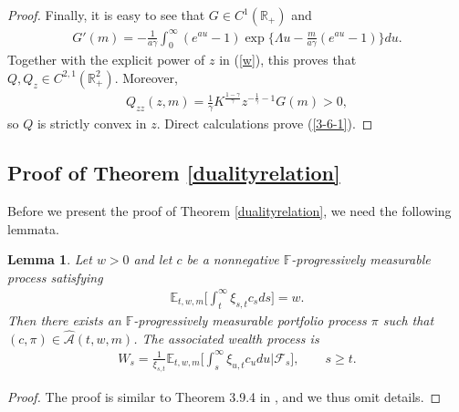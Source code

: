 \documentclass[a4paper,11pt]{amsart}
\numberwithin{equation}{section}
\newtheorem{lemma}{Lemma}[section]
\begin{document}
{\begin{proof}
Finally, it is easy to see that $G\in C^1(\mathbb R_+)$ and
\begin{align*}
G'(m)=-\frac{1}{a\gamma}\int_0^\infty(e^{au}-1)\exp\bigg\{\Lambda u-\frac{m}{a\gamma}(e^{au}-1)\bigg\}du.
\end{align*}
Together with the explicit power of $z$ in (\ref{w}), this proves that $Q,Q_z\in C^{2,1}(\mathbb R^2_+)$. Moreover,
\begin{align*}
Q_{zz}(z,m)=\frac{1}{\gamma}K^{\frac{1-\gamma}{\gamma}}z^{-\frac{1}{\gamma}-1}G(m)>0,
\end{align*}
so $Q$ is strictly convex in $z$. Direct calculations prove (\ref{3-6-1}).
\end{proof}


\subsection{Proof of Theorem \ref{dualityrelation}}\label{produal}
Before we present the proof of Theorem \ref{dualityrelation}, we need the following lemmata.
\begin{lemma}\label{postbudget}
{Let $w>0$ and let $c$ be a nonnegative $\mathbb F$-progressively measurable process satisfying}
\begin{align*}
{\mathbb E_{t,w,m}\bigg[\int_t^\infty\xi_{s,t}c_sds\bigg]=w.}
\end{align*}
{Then there exists an $\mathbb F$-progressively measurable portfolio process $\pi$ such that $(c,\pi)\in\widehat{\mathcal A}(t,w,m)$. The associated wealth process is}
\begin{align}\label{postwealthbudget}
{W_s=\frac{1}{\xi_{s,t}}\mathbb E_{t,w,m}\bigg[\int_s^\infty\xi_{u,t}c_udu\bigg|\mathcal F_s\bigg],\qquad s\geq t.}
\end{align}
\end{lemma}
\begin{proof}
The proof is similar to Theorem 3.9.4 in \cite{karatzas1998methods}, and we thus omit details.
\end{proof}

}
\end{document}
